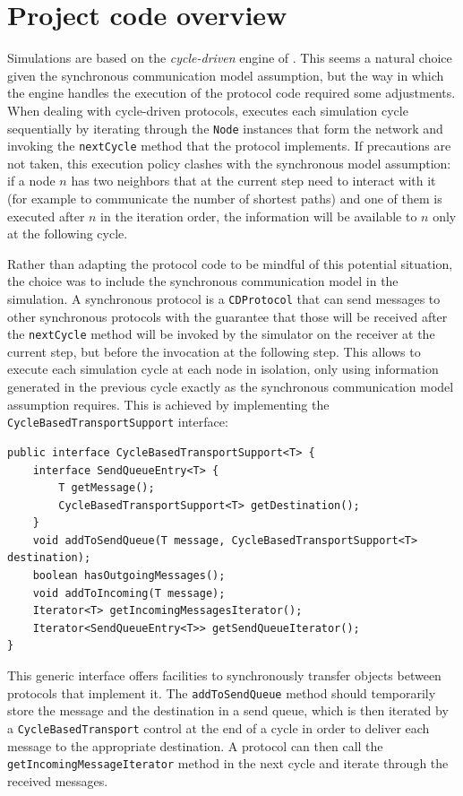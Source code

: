 
\section{Project code overview}


Simulations are based on the \emph{cycle-driven} engine of \peersim{}. This seems a natural choice given the synchronous communication model assumption, but the way in which the engine handles the execution of the protocol code required some adjustments. When dealing with cycle-driven protocols, \peersim{} executes each simulation cycle sequentially by iterating through the \texttt{Node} instances that form the network and invoking the \texttt{nextCycle} method that the protocol implements. If precautions are not taken, this execution policy clashes with the synchronous model assumption: if a node $n$ has two neighbors that at the current step need to interact with it (for example to communicate the number of shortest paths) and one of them is executed after $n$ in the iteration order, the information will be available to $n$ only at the following cycle.

Rather than adapting the protocol code to be mindful of this potential situation, the choice was to include the synchronous communication model in the simulation. A synchronous protocol is a \texttt{CDProtocol} that can send messages to other synchronous protocols with the guarantee that those will be received after the \texttt{nextCycle} method will be invoked by the simulator on the receiver at the current step, but before the invocation at the following step. This allows to execute each simulation cycle at each node in isolation, only using information generated in the previous cycle exactly as the synchronous communication model assumption requires. This is achieved by implementing the \texttt{CycleBasedTransportSupport} interface:
\begin{verbatim}
public interface CycleBasedTransportSupport<T> {
    interface SendQueueEntry<T> {
        T getMessage();
        CycleBasedTransportSupport<T> getDestination();
    }
    void addToSendQueue(T message, CycleBasedTransportSupport<T> destination);
    boolean hasOutgoingMessages();
    void addToIncoming(T message);
    Iterator<T> getIncomingMessagesIterator();
    Iterator<SendQueueEntry<T>> getSendQueueIterator();
}
\end{verbatim}
This generic interface offers facilities to synchronously transfer objects between protocols that implement it. The \texttt{addToSendQueue} method should temporarily store the message and the destination in a send queue, which is then iterated by a \texttt{CycleBasedTransport} control at the end of a cycle in order to deliver each message to the appropriate destination. A protocol can then call the \texttt{getIncomingMessageIterator} method in the next cycle and iterate through the received messages.

